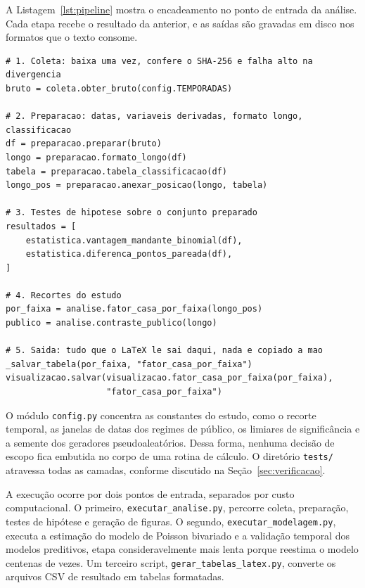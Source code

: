 A Listagem~\ref{lst:pipeline} mostra o encadeamento no ponto de entrada da
análise. Cada etapa recebe o resultado da anterior, e as saídas são gravadas em
disco nos formatos que o texto consome.

\begin{sourcecode}[htb]
  \caption{Encadeamento das etapas em \texttt{scripts/executar\_analise.py}.}
  \label{lst:pipeline}
\begin{lstlisting}
# 1. Coleta: baixa uma vez, confere o SHA-256 e falha alto na divergencia
bruto = coleta.obter_bruto(config.TEMPORADAS)

# 2. Preparacao: datas, variaveis derivadas, formato longo, classificacao
df = preparacao.preparar(bruto)
longo = preparacao.formato_longo(df)
tabela = preparacao.tabela_classificacao(df)
longo_pos = preparacao.anexar_posicao(longo, tabela)

# 3. Testes de hipotese sobre o conjunto preparado
resultados = [
    estatistica.vantagem_mandante_binomial(df),
    estatistica.diferenca_pontos_pareada(df),
]

# 4. Recortes do estudo
por_faixa = analise.fator_casa_por_faixa(longo_pos)
publico = analise.contraste_publico(longo)

# 5. Saida: tudo que o LaTeX le sai daqui, nada e copiado a mao
_salvar_tabela(por_faixa, "fator_casa_por_faixa")
visualizacao.salvar(visualizacao.fator_casa_por_faixa(por_faixa),
                    "fator_casa_por_faixa")
\end{lstlisting}
\end{sourcecode}

O módulo \texttt{config.py} concentra as constantes do estudo, como o recorte
temporal, as janelas de datas dos regimes de público, os limiares de
significância e a semente dos geradores pseudoaleatórios. Dessa forma, nenhuma
decisão de escopo fica embutida no corpo de uma rotina de cálculo. O diretório \texttt{tests/}
atravessa todas as camadas, conforme discutido na Seção~\ref{sec:verificacao}.

A execução ocorre por dois pontos de entrada, separados por custo computacional.
O primeiro, \texttt{executar\_analise.py}, percorre coleta, preparação, testes de
hipótese e geração de figuras. O segundo, \texttt{executar\_mo\-de\-la\-gem.py},
executa a estimação do modelo de Poisson bivariado e a validação temporal dos
modelos preditivos, etapa consideravelmente mais lenta porque reestima o modelo
centenas de vezes. Um terceiro script, \texttt{gerar\_tabelas\_latex.py},
converte os arquivos CSV de resultado em tabelas formatadas.

